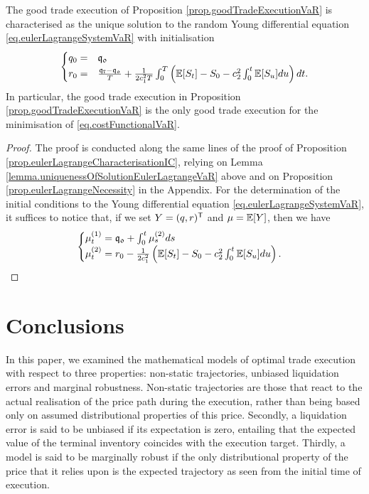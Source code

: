 \documentclass[10pt,a4paper]{article}
\begin{document}
\begin{prop}\label{prop.characterisationEulerLagrangeVaR}
The good trade execution of Proposition \ref{prop.goodTradeExecutionVaR} is characterised as the unique solution to the random Young differential equation \eqref{eq.eulerLagrangeSystemVaR} with initialisation
\begin{equation*}
\begin{cases}
q_0 =& \mathfrak{q_0} \\
r_0 =& \frac{\mathfrak{q}_{\mathtt{T} } - \mathfrak{q_0}}{T}  +\frac{1}{2c_{1}^{2} T} \int_{0}^{T} \left(\mathbb{{E}}[S_t] - S_0 - c_{2}^{2} \int_{0}^{t} \mathbb{{E}}[S_u]du\right)dt.
\end{cases}
\end{equation*}
In particular, the good trade execution in Proposition \ref{prop.goodTradeExecutionVaR} is the only good trade execution for the minimisation of \eqref{eq.costFunctionalVaR}.
\end{prop}
\begin{proof}
The proof is conducted along the same lines of the proof of Proposition \ref{prop.eulerLagrangeCharacterisationIC}, relying  on Lemma \ref{lemma.uniquenessOfSolutionEulerLagrangeVaR} above and on Proposition \ref{prop.eulerLagrangeNecessity} in the Appendix. For the determination of the initial conditions to the Young differential equation \eqref{eq.eulerLagrangeSystemVaR}, it suffices to notice that, if we set $Y=(q,r)^{\mathsf{T}}$ and $\mu=\mathbb{{E}}[Y]$, then we have
\begin{equation*}
\begin{cases}
\mu^{(1)}_t = \mathfrak{q_0} + \int_{0}^{t} \mu^{(2)}_s ds \\
\mu^{(2)}_t = r_0 - \frac{1}{2c_{1}^{2}} \left(\mathbb{{E}}[S_t] -S_0 - c_{2}^{2} \int_{0}^{t} \mathbb{{E}}[S_u]du \right).
\end{cases}
\end{equation*}

\end{proof}


\section{Conclusions}\label{sec.conclusions}
In this paper, we examined the mathematical models of optimal trade execution with respect to three properties: non-static trajectories, unbiased liquidation errors and marginal robustness. Non-static trajectories are those that react to the actual realisation of the price path during the execution, rather than being based only on assumed distributional properties of this price. Secondly, a liquidation error is said to be unbiased if its expectation is zero, entailing that the expected value of the terminal  inventory coincides with the execution target.  Thirdly, a model is said to be marginally robust if the only distributional property of the price that it relies upon is the expected trajectory as seen from the initial time of execution. 
\end{document}
